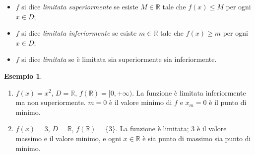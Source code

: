 \documentclass[11pt,a4paper]{article}
\theoremstyle{definition}
\newtheorem*{esempio}{Esempio}
\begin{document}
\begin{definizione}
\begin{itemize}
    \item $f$ si dice \emph{limitata superiormente} se esiste $M \in \mathbb{R}$ tale che $f(x) \leq M$ per ogni $x \in D$;
    \item $f$ si dice \emph{limitata inferiormente} se esiste $m \in \mathbb{R}$ tale che $f(x) \geq m$ per ogni $x \in D$;
    \item $f$ si dice \emph{limitata} se è limitata sia superiormente sia inferiormente.
\end{itemize}
\end{definizione}

\begin{esempio}
\leavevmode
\begin{enumerate}
    \item $f(x) = x^2$, $D = \mathbb{R}$, $f(\mathbb{R}) = [0, +\infty)$. La funzione è limitata inferiormente ma non superiormente. $m = 0$ è il valore minimo di $f$ e $x_m = 0$ è il punto di minimo.
    \item $f(x) = 3$, $D = \mathbb{R}$, $f(\mathbb{R}) = \{3\}$. La funzione è limitata; $3$ è il valore massimo e il valore minimo, e ogni $x \in \mathbb{R}$ è sia punto di massimo sia punto di minimo.
\end{enumerate}
\end{esempio}
\end{document}
